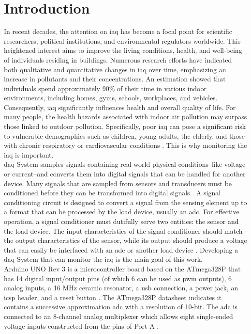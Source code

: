 \section{Introduction}
\label{sec:introduction}
\hspace{8pt}
In recent decades, the attention on \acrfull{iaq} has become a focal point for scientific researchers, political institutions, and environmental regulators worldwide. This heightened interest aims to improve the living conditions, health, and well-being of individuals residing in buildings. Numerous research efforts have indicated both qualitative and quantitative changes in \acrshort{iaq} over time, emphasizing an increase in pollutants and their concentrations. An estimation showed that individuals spend approximately 90\% of their time in various indoor environments, including homes, gyms, schools, workplaces, and vehicles. Consequently, \acrshort{iaq} significantly influences health and overall quality of life. For many people, the health hazards associated with indoor air pollution may surpass those linked to outdoor pollution. Specifically, poor \acrshort{iaq} can pose a significant risk to vulnerable demographics such as children, young adults, the elderly, and those with chronic respiratory or cardiovascular conditions \cite{cincinelli_2017}. This is why monitoring the \acrshort{iaq} is important. \\

\acrfull{daq} System samples signals containing real-world physical conditions--like voltage or current--and converts them into digital signals that can be handled for another device. Many signals that are sampled from sensors and transducers must be conditioned before they can be transformed into digital signals \cite{di_paolo_2013}. A signal conditioning circuit is designed to convert a signal from the sensing element up to a format that can be processed by the load device, usually an \acrfull{adc}. For effective operation, a signal conditioner must dutifully serve two entities: the sensor and the load device. The input characteristics of the signal conditioner should match the output characteristics of the sensor, while its output should produce a voltage that can easily be interfaced with an \acrshort{adc} or another load device \cite{fraden_2016}. Developing a \acrshort{daq} System that can monitor the \acrshort{iaq} is the main goal of this work. \\

Arduino UNO Rev 3 is a microcontroller board based on the ATmega328P that has 14 digital input/output pins (of which 6 can be used as \acrfull{pwm} outputs), 6 analog inputs, a 16 MHz ceramic resonator, a \acrfull{usb} connection, a power jack, an \acrfull{icsp} header, and a reset button \cite{arduino_2024}. The ATmega328P datasheet \cite{atmega328p} indicates it contains a successive approximation \acrshort{adc} with a resolution of 10-bit. The \acrshort{adc} is connected to an 8-channel analog multiplexer which allows eight single-ended voltage inputs constructed from the pins of Port A \cite{atmega328p}.

